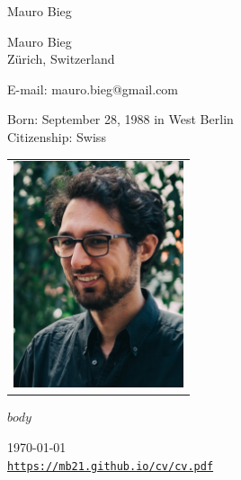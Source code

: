 \documentclass{article}
\def\name{Mauro Bieg}
\def\footerlink{https://mb21.github.io/cv/cv.pdf}
\begin{document}
\begin{minipage}{10cm}
	{\huge \name}
	
	\vspace{7mm}
	
	Mauro Bieg\\
	Zürich, Switzerland\\
	
	\vspace{-3mm}
	
	E-mail: mauro.bieg@gmail.com\\
	
	\vspace{-3mm}
	
	Born: September 28, 1988 in West Berlin \\
	Citizenship: Swiss
\end{minipage}
\begin{minipage}{50mm}
  \begin{tabular}{r}
  	\includegraphics[width=50mm]{me.jpg}
  \end{tabular}
\end{minipage}



\vspace{6mm}

$body$

\bigskip

\begin{center}
  \begin{footnotesize}
    \today \\
    \href{\footerlink}{\texttt{\footerlink}}
  \end{footnotesize}
\end{center}
\end{document}
